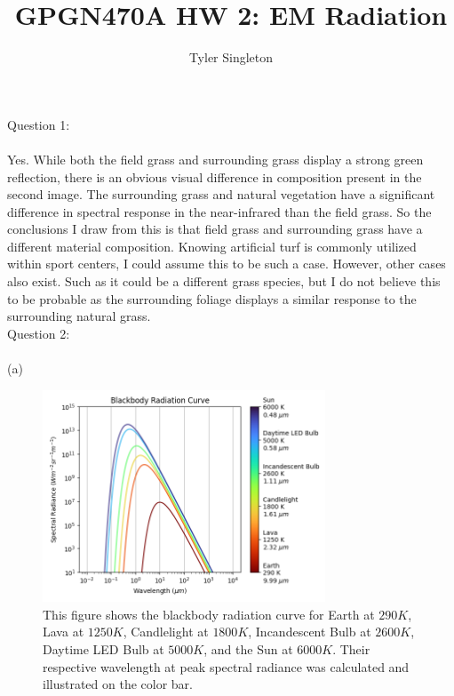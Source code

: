 \documentclass{homework}
\title{GPGN470A HW 2: EM Radiation}
\author{Tyler Singleton}
\begin{document}
\maketitle

Question 1: \\ \\
Yes. While both the field grass and surrounding grass display a strong green reflection, there is an obvious visual difference in composition present in the second image. The surrounding grass and natural vegetation have a significant difference in spectral response in the near-infrared than the field grass. So the conclusions I draw from this is that field grass and surrounding grass have a different material composition. Knowing artificial turf is commonly utilized within sport centers, I could assume this to be such a case. However, other cases also exist. Such as it could be a  different grass species, but I do not believe this to be probable as the surrounding foliage displays a similar response to the surrounding natural grass. \\


Question 2: \\ \\
(a)
\begin{figure}[h]
    \centering
    \includegraphics[width=0.75\textwidth]{Blackbody_Curve.png}
    \caption{This figure shows the blackbody radiation curve for Earth at $290 K$, Lava at $1250 K$, Candlelight at $1800 K$, Incandescent Bulb at $2600 K$, Daytime LED Bulb at $5000 K$, and the Sun at $6000 K$. Their respective wavelength at peak spectral radiance was calculated and illustrated on the color bar.}
    \label{fig:blackbody}
\end{figure}
\end{document}
